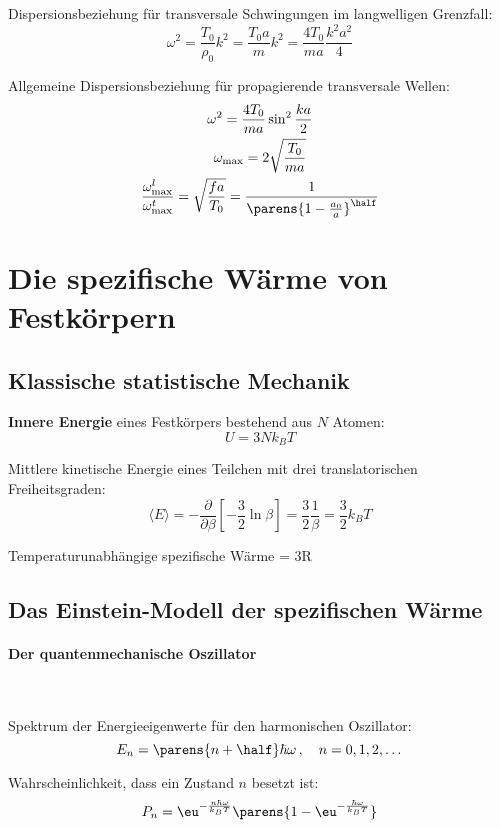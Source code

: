 		Dispersionsbeziehung für transversale Schwingungen im langwelligen Grenzfall:
		\[
			\omega^2 = \frac{T_0}{\rho_0} k^2 = \frac{T_0 a}{m} k^2 = \frac{4 T_0}{ma} \frac{k^2 a^2}{4}
		\]
		
		Allgemeine Dispersionsbeziehung für propagierende transversale Wellen:
		\begin{gather*}
			\omega^2 = \frac{4 T_0}{ma} \sin^2 \frac{ka}{2} \\
			\omega_\text{max} = 2 \sqrt{\frac{T_0}{ma}} \\
			\frac{\omega_\text{max}^l}{\omega_\text{max}^t} =
				\sqrt{\frac{fa}{T_0}} = \frac{1}{\parens{1-\frac{a_0}{a}}^\half}
		\end{gather*}

\section{Die spezifische Wärme von Festkörpern} %
	\subsection{Klassische statistische Mechanik} %
		\textbf{Innere Energie} eines Festkörpers bestehend aus $N$ Atomen:
		\[
			U = 3 N k_B T
		\]

		Mittlere kinetische Energie eines Teilchen mit drei translatorischen
		Freiheitsgraden:
		\[
			\langle E \rangle = -\frac{\partial}{\partial \beta}
			\left[-\frac 3 2 \ln \beta \right] = \frac 3 2 \frac 1 \beta = \frac 3 2 k_B T
		\]
		
		Temperaturunabhängige spezifische Wärme = 3R
	\subsection{Das Einstein-Modell der spezifischen Wärme} %
		\paragraph{Der quantenmechanische Oszillator} %
			~
			
			Spektrum der Energieeigenwerte für den harmonischen Oszillator:
			\[
				E_n = \parens{n + \half} \hbar \omega \,,\quad n = 0,1,2,\dots
			\]

			Wahrscheinlichkeit, dass ein Zustand $n$ besetzt ist:
			\[
				P_n = \eu^{-\frac{n\hbar\omega}{k_B T}}\parens{1 - \eu^{-\frac{\hbar\omega}{k_B T}}}
			\]

